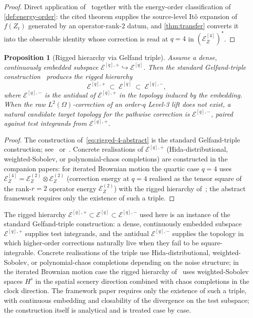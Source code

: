 \documentclass[11pt,reqno]{amsart}
\theoremstyle{plain}
\newtheorem{proposition}[theorem]{Proposition}
\theoremstyle{definition}
\theoremstyle{remark}
\newcommand{\Energy}{\mathcal{E}}
\newcommand{\IBM}{Z}
\begin{document}
\begin{proof}
Direct application of~\cite[Theorem~7.1]{IBMPaper} together with the
energy-order classification of \cref{def:energy-order}: the cited
theorem supplies the source-level It\^o expansion of $f(\IBM_t)$
generated by an operator-rank-$2$ datum, and \cref{thm:transfer}
converts it into the observable identity whose correction is read at
$q=4$ in $(\Energy_\IBM^{[4]})^{*}$.
\end{proof}

\begin{proposition}[Rigged hierarchy via Gelfand triple]
\label{prop:quartic-dual}
Assume a dense, continuously embedded subspace
$\Energy^{[q],+}\hookrightarrow\Energy^{[q]}$.
Then the standard Gelfand-triple
construction~\cite{Berezansky,HidaKuoPotthoff} produces the rigged
hierarchy
\begin{equation}\label{eq:rigged-4-abstract}
  \Energy^{[q],+}\;\subset\;\Energy^{[q]}\;\subset\;\Energy^{[q],-},
\end{equation}
where $\Energy^{[q],-}$ is the antidual of $\Energy^{[q],+}$ in the
topology induced by the embedding. When the raw
$L^{2}(\Omega)$-correction of an order-$q$ Level-3 lift does not exist,
a natural candidate target topology for the pathwise correction is
$\Energy^{[q],-}$, paired against test integrands from
$\Energy^{[q],+}$.
\end{proposition}

\begin{proof}
The construction of~\eqref{eq:rigged-4-abstract} is the standard
Gelfand-triple construction; see~\cite[Ch.~1]{Berezansky}
or~\cite[Sec.~3]{HidaKuoPotthoff}. Concrete realisations of
$\Energy^{[q],+}$ (Hida-distributional, weighted-Sobolev, or
polynomial-chaos completions) are constructed in the companion papers:
for iterated Brownian motion the quartic case $q=4$ uses
$\Energy_\IBM^{[4]}=\Energy_\IBM^{(2)}\otimes\Energy_\IBM^{(2)}$
(correction energy at $q=4$ realised as the tensor square of the
rank-$r=2$ operator energy $\Energy_\IBM^{(2)}$) with the rigged
hierarchy of~\cite[\S5]{IBMPaper}; the abstract framework requires
only the existence of such a triple.
\end{proof}

The rigged hierarchy
$\Energy^{[q],+}\subset\Energy^{[q]}\subset\Energy^{[q],-}$ used
here is an instance of the standard Gelfand-triple construction: a
dense, continuously embedded subspace $\Energy^{[q],+}$ supplies test
integrands, and the antidual $\Energy^{[q],-}$ supplies the topology
in which higher-order corrections naturally live when they fail to be
square-integrable. Concrete realisations of the triple use
Hida-distributional, weighted-Sobolev, or polynomial-chaos
completions depending on the noise structure; in the iterated
Brownian motion case the rigged hierarchy of~\cite[\S5]{IBMPaper}
uses weighted-Sobolev spaces $H^{s}$ in the spatial scenery direction
combined with chaos completions in the clock direction. The framework
paper requires only the existence of such a triple, with continuous
embedding and closability of the divergence on the test subspace; the
construction itself is analytical and is treated case by case.
\end{document}
